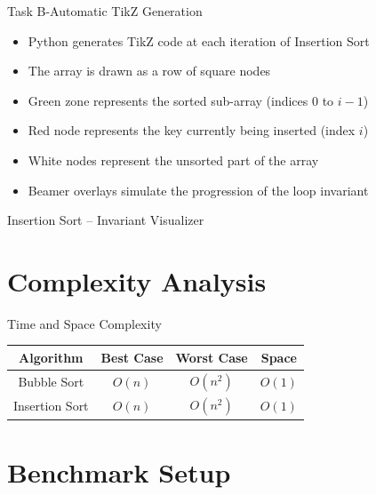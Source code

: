 \documentclass[aspectratio=169]{beamer}
\begin{document}
\begin{frame}{Task B-Automatic TikZ Generation }

\begin{itemize}
    \item<1-> Python generates TikZ code at each iteration of Insertion Sort
    \item<2-> The array is drawn as a row of square nodes
    \item<3-> Green zone represents the sorted sub-array (indices $0$ to $i-1$)
    \item<4-> Red node represents the key currently being inserted (index $i$)
    \item<5-> White nodes represent the unsorted part of the array
    \item<6-> Beamer overlays simulate the progression of the loop invariant
\end{itemize}
\end{frame}

\begin{frame}{Insertion Sort – Invariant Visualizer}


\vspace{0.3cm}



\end{frame}



\section{Complexity Analysis}

\begin{frame}{Time and Space Complexity}
\begin{center}
\begin{tabular}{|c|c|c|c|}
\hline
Algorithm & Best Case & Worst Case & Space \\
\hline
Bubble Sort & $O(n)$ & $O(n^2)$ & $O(1)$ \\
Insertion Sort & $O(n)$ & $O(n^2)$ & $O(1)$ \\
\hline
\end{tabular}
\end{center}
\end{frame}

\section{Benchmark Setup}
\end{document}
